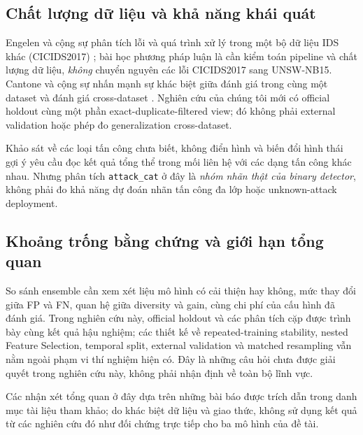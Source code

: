 \subsection{Chất lượng dữ liệu và khả năng khái quát}
Engelen và cộng sự phân tích lỗi và quá trình xử lý trong một bộ dữ liệu IDS khác (CICIDS2017) \cite{legacyL02}; bài học phương pháp luận là cần kiểm toán pipeline và chất lượng dữ liệu, \emph{không} chuyển nguyên các lỗi CICIDS2017 sang UNSW-NB15. Cantone và cộng sự nhấn mạnh sự khác biệt giữa đánh giá trong cùng một dataset và đánh giá cross-dataset \cite{legacyL09}. Nghiên cứu của chúng tôi mới có official holdout cùng một phần exact-duplicate-filtered view; đó không phải external validation hoặc phép đo generalization cross-dataset.

Khảo sát về các loại tấn công chưa biết, không điển hình và biến đổi hình thái \cite{legacyL10} gợi ý yêu cầu đọc kết quả tổng thể trong mối liên hệ với các dạng tấn công khác nhau. Nhưng phân tích \texttt{attack\_cat} ở đây là \emph{nhóm nhãn thật của binary detector}, không phải đo khả năng dự đoán nhãn tấn công đa lớp hoặc unknown-attack deployment.

\subsection{Khoảng trống bằng chứng và giới hạn tổng quan}
So sánh ensemble cần xem xét liệu mô hình có cải thiện hay không, mức thay đổi giữa FP và FN, quan hệ giữa diversity và gain, cùng chi phí của cấu hình đã đánh giá. Trong nghiên cứu này, official holdout và các phân tích cặp được trình bày cùng kết quả hậu nghiệm; các thiết kế về repeated-training stability, nested Feature Selection, temporal split, external validation và matched resampling vẫn nằm ngoài phạm vi thí nghiệm hiện có. Đây là những câu hỏi chưa được giải quyết trong nghiên cứu này, không phải nhận định về toàn bộ lĩnh vực.

Các nhận xét tổng quan ở đây dựa trên những bài báo được trích dẫn trong danh mục tài liệu tham khảo; do khác biệt dữ liệu và giao thức, không sử dụng kết quả từ các nghiên cứu đó như đối chứng trực tiếp cho ba mô hình của đề tài.
